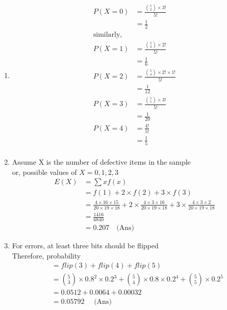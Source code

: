 \documentclass[a4paper, 12pt]{article}
\begin{document}
\begin{enumerate}
	\item 
	\begin{align*}
		P(X=0) &= \frac{\binom{5}{2}\times 3!}{5!}\\
		&= \frac{1}{2}\\
		\textrm{similarly, }\\
		P(X=1) &= \frac{\binom{5}{3}\times 2!}{5!}\\
		&= \frac{1}{6}\\
		P(X=2) &= \frac{\binom{5}{4}\times 2! \times 1!}{5!}\\
		&= \frac{1}{12}\\
		P(X=3) &= \frac{\binom{5}{5}\times 3!}{5!}\\
		&= \frac{1}{20}\\
		P(X=4) &= \frac{4!}{5!}\\
		&= \frac{1}{5}\\
	\end{align*}
	
	\item Assume X is the number of defective items
	in the sample\\
	or, possible values of $X = 0, 1, 2, 3$\\
	
	\begin{align*}
		E(X) &= \sum xf(x)\\
		&= f(1) + 2\times f(2) + 3 \times f(3)\\
		&= \frac{4\times16\times15}{20\times19\times18}
		+ 2\times\frac{4\times3\times16}{20\times19\times18}
		+ 3\times\frac{4\times3\times2}{20\times19\times18}\\
		&= \frac{1416}{6840}\\
		&= 0.207 \quad\text{(Ans)}
	\end{align*}
	
	\item For errors, at least three bits should be flipped\\
	Therefore, probability \\
	\begin{align*}
	&= flip(3) + flip(4) + flip(5)\\
	&= \binom{5}{3}\times 0.8^2 \times 0.2^3 +
	\binom{5}{4} \times 0.8 \times0.2^4 +
	\binom{5}{5} \times 0.2^5\\
	&= 0.0512 + 0.0064 + 0.00032\\
	&= 0.05792 \quad \text{ (Ans)}
	\end{align*}
	

\end{enumerate}
\end{document}
